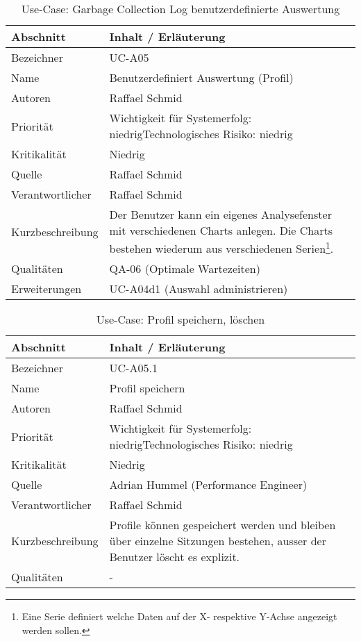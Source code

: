 \begin{longtable}{|p{4cm}|p{10.5cm}|}
\caption{Use-Case: Garbage Collection Log benutzerdefinierte Auswertung }\\\hline
   \textbf{Abschnitt} & \textbf{Inhalt / Erläuterung} \\\hline
   Bezeichner & UC-A05\\\hline
   Name & Benutzerdefiniert Auswertung (Profil)\\\hline
   Autoren & Raffael Schmid\\\hline
   Priorität & Wichtigkeit für Systemerfolg: niedrig\newline Technologisches Risiko: niedrig\\\hline
   Kritikalität & Niedrig\\\hline
   Quelle & Raffael Schmid\\\hline
   Verantwortlicher & Raffael Schmid\\\hline
   Kurzbeschreibung & Der Benutzer kann ein eigenes Analysefenster mit verschiedenen Charts anlegen. Die Charts bestehen wiederum aus verschiedenen Serien\footnote{Eine Serie definiert welche Daten auf der X- respektive Y-Achse angezeigt werden sollen.}.\\\hline
   Qualitäten & QA-06 (Optimale Wartezeiten)\\\hline
   Erweiterungen & UC-A04d1 (Auswahl administrieren)\\\hline
\end{longtable}

\begin{longtable}{|p{4cm}|p{10.5cm}|}
\caption{Use-Case: Profil speichern, löschen }\\\hline
   \textbf{Abschnitt} & \textbf{Inhalt / Erläuterung} \\\hline
   Bezeichner & UC-A05.1\\\hline
   Name & Profil speichern\\\hline
   Autoren & Raffael Schmid\\\hline
   Priorität & Wichtigkeit für Systemerfolg: niedrig\newline Technologisches Risiko: niedrig\\\hline
   Kritikalität & Niedrig\\\hline
   Quelle & Adrian Hummel (Performance Engineer)\\\hline
   Verantwortlicher & Raffael Schmid\\\hline
   Kurzbeschreibung & Profile können gespeichert werden und bleiben über einzelne Sitzungen bestehen, ausser der Benutzer löscht es explizit.\\\hline
   Qualitäten & -\\\hline
\end{longtable}

